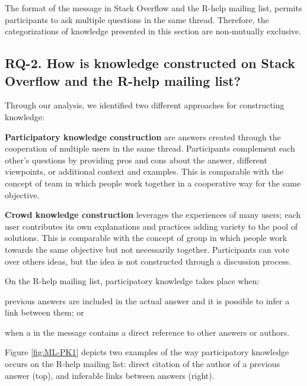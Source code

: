 	The format of the message in Stack Overflow and the R-help mailing list, permits participants to ask multiple questions in the same thread.
	Therefore, the categorizations of knowledge presented in this section are non-mutually exclusive.

\subsection{RQ-2. How is knowledge constructed on Stack Overflow and the R-help mailing list?}
\label{sec:rq2}

    Through our analysis, we identified two different approaches for constructing knowledge:
    \begin{packed_enum}
        \item \textbf{Participatory knowledge construction} are answers created through the cooperation of multiple users in the same thread.
        Participants complement each other's questions by providing pros and cons about the answer, different viewpoints, or additional context and examples.
        This is comparable with the concept of team in which people work together in a cooperative way for the same objective.

        \item \textbf{Crowd knowledge construction} leverages the experiences of many users; each user contributes its own explanations and practices adding variety to the pool of solutions.
        This is comparable with the concept of group in which people work towards the same objective but not necessarily together.
        Participants can vote over others ideas, but the idea is not constructed through a discussion process.
    \end{packed_enum}

    On the R-help mailing list, participatory knowledge takes place when:
    \begin{enumerate*}[label=(\arabic*)]
    \item previous answers are included in the actual answer and it is possible to infer a link between them; or
    \item when a in the message contains a direct reference to other answers or authors.
    \end{enumerate*}
    Figure \ref{fig:ML-PK1} depicts two examples of the way participatory knowledge occurs on the R-help mailing list:
    direct citation of the author of a previous answer (top), and inferable links between answers (right).

